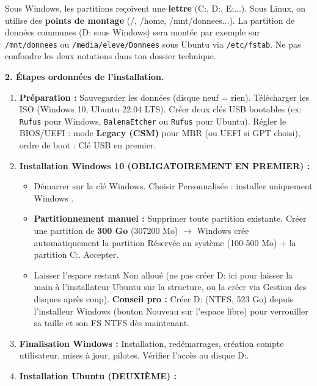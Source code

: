 \documentclass[11pt]{article}
\begin{document}
\begin{exoresolu}
\begin{attention}
Sous Windows, les partitions reçoivent une \textbf{lettre} (C:, D:, E:...). Sous Linux, on utilise des \textbf{points de montage} (/, /home, /mnt/donnees...). La partition de données communes (D: sous Windows) sera montée par exemple sur \texttt{/mnt/donnees} ou \texttt{/media/eleve/Donnees} sous Ubuntu via \texttt{/etc/fstab}. Ne pas confondre les deux notations dans ton dossier technique.
\end{attention}

\textbf{2. Étapes ordonnées de l'installation.}

\begin{methode}
\begin{enumerate}
  \item \textbf{Préparation :} Sauvegarder les données (disque neuf = rien). Télécharger les ISO (Windows 10, Ubuntu 22.04 LTS). Créer deux clés USB bootables (ex: \texttt{Rufus} pour Windows, \texttt{BalenaEtcher} ou \texttt{Rufus} pour Ubuntu). Régler le BIOS/UEFI : mode \textbf{Legacy (CSM)} pour MBR (ou UEFI si GPT choisi), ordre de boot : Clé USB en premier.
  \item \textbf{Installation Windows 10 (OBLIGATOIREMENT EN PREMIER) :}
        \begin{itemize}
          \item Démarrer sur la clé Windows. Choisir \og Personnalisée : installer uniquement Windows \fg.
          \item \textbf{Partitionnement manuel :} Supprimer toute partition existante. Créer une partition de \textbf{300 Go} (307200 Mo) $\rightarrow$ Windows crée automatiquement la partition \og Réservée au système \fg (100-500 Mo) + la partition C:. Accepter.
          \item Laisser l'espace restant \og Non alloué \fg (ne pas créer D: ici pour laisser la main à l'installateur Ubuntu sur la structure, ou la créer via Gestion des disques après coup). \textbf{Conseil pro :} Créer D: (NTFS, 523 Go) depuis l'installeur Windows (bouton \og Nouveau \fg sur l'espace libre) pour verrouiller sa taille et son FS NTFS dès maintenant.
        \end{itemize}
  \item \textbf{Finalisation Windows :} Installation, redémarrages, création compte utilisateur, mises à jour, pilotes. Vérifier l'accès au disque D:.
  \item \textbf{Installation Ubuntu (DEUXIÈME) :}

\end{enumerate}
\end{methode}
\end{exoresolu}
\end{document}
